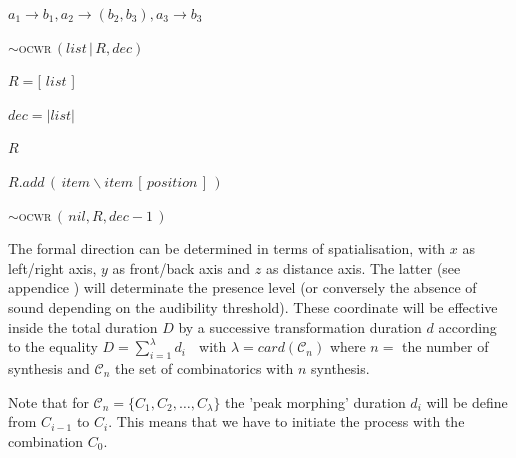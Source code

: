 $a_1 \rightarrow b_1, a_2 \rightarrow (b_2, b_3), a_3 \rightarrow b_3$

\smallskip

\begin{algorithm}
\caption{$\sim$\textsc{ocwr}$\,(list\,|\,R, dec)$}\label{ocwr}
\begin{algorithmic}%



$R=$[ $list$ ]

$dec=| list |$
\EndIf


\Return $R$
\Else




$R.add\,(\,item \backslash item\,[\,position\,]\,)$

\EndFor
\EndIf
\EndFor

$\sim$\textsc{ocwr}$\,(\,nil, R,  dec-1\,)$

\EndIf

\end{algorithmic}
\end{algorithm}

\bigskip

The formal direction can be determined in terms of spatialisation, with $x$ as left/right axis, $y$ as front/back axis and $z$ as distance axis. The latter (see appendice ) will determinate the presence level (or conversely the absence of sound depending on the audibility threshold).
These coordinate will be effective inside the total duration $D$ by a successive transformation duration $d$ according to the equality $D=\displaystyle \sum\limits_{i=1}^{\lambda}d_i$
$\;$ with $\lambda = card(\mathcal{C}_n)$ where $n=$ the number of synthesis and $\mathcal{C}_n$ the set of combinatorics with $n$ synthesis. 

Note that for  $\mathcal{C}_n=\{ C_1, C_2, \dots, C_{\lambda} \}$ the 'peak morphing' duration $d_i$ will be define from $C_{i-1}$ to $C_{i}$. This means that we have to initiate the process with the combination $C_0$.

